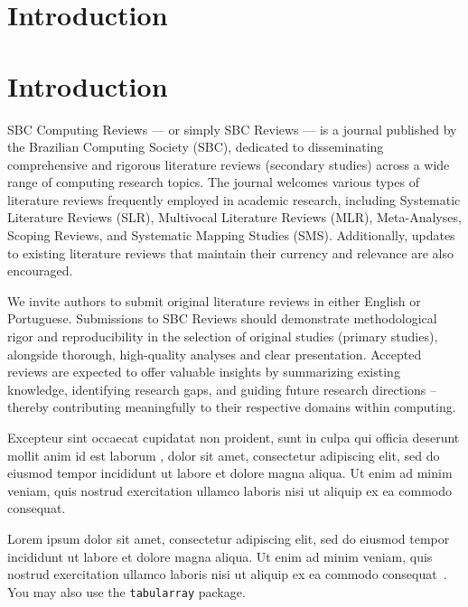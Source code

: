 \documentclass[english]{sbcreviews-2025}%
\begin{document}
\section{Introduction}\label{sec:intro}



\section{Introduction}
\label{sec:intro}

SBC Computing Reviews — or simply SBC Reviews — is a journal published by the Brazilian Computing Society (SBC), dedicated to disseminating comprehensive and rigorous literature reviews (secondary studies) across a wide range of computing research topics. The journal welcomes various types of literature reviews frequently employed in academic research, including Systematic Literature Reviews (SLR), Multivocal Literature Reviews (MLR), Meta-Analyses, Scoping Reviews, and Systematic Mapping Studies (SMS). Additionally, updates to existing literature reviews that maintain their currency and relevance are also encouraged.

We invite authors to submit original literature reviews in either English or Portuguese. Submissions to SBC Reviews should demonstrate methodological rigor and reproducibility in the selection of original studies (primary studies), alongside thorough, high-quality analyses and clear presentation. Accepted reviews are expected to offer valuable insights by summarizing existing knowledge, identifying research gaps, and guiding future research directions – thereby contributing meaningfully to their respective domains within computing. 


Excepteur sint occaecat cupidatat non proident, sunt in culpa qui officia deserunt mollit anim id est laborum \citep{ref3}, dolor sit amet, consectetur adipiscing elit, sed do eiusmod tempor incididunt ut labore et dolore magna aliqua. Ut enim ad minim veniam, quis nostrud exercitation ullamco laboris nisi ut aliquip ex ea commodo consequat.

Lorem ipsum dolor sit amet, consectetur adipiscing elit, sed do eiusmod tempor incididunt ut labore et dolore magna aliqua. Ut enim ad minim veniam, quis nostrud exercitation ullamco laboris nisi ut aliquip ex ea commodo consequat~\citep{ref4}.
You may also use the \texttt{tabularray} package.
\end{document}
